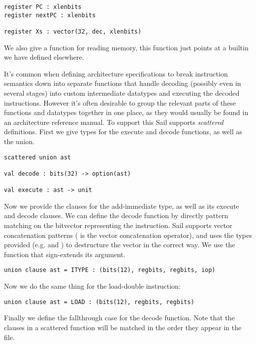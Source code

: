 \begin{lstlisting}
register PC : xlenbits
register nextPC : xlenbits

register Xs : vector(32, dec, xlenbits)
\end{lstlisting}



\sailoverloadAX

We also give a function  for reading memory, this function
just points at a builtin we have defined elsewhere.


It's common when defining architecture specifications to break
instruction semantics down into separate functions that handle
decoding (possibly even in several stages) into custom intermediate
datatypes and executing the decoded instructions. However it's often
desirable to group the relevant parts of these functions and datatypes
together in one place, as they would usually be found in an
architecture reference manual. To support this Sail supports
\emph{scattered} definitions. First we give types for the execute and
decode functions, as well as the  union.


\begin{lstlisting}
scattered union ast

val decode : bits(32) -> option(ast)

val execute : ast -> unit
\end{lstlisting}

Now we provide the clauses for the add-immediate  type, as
well as its execute and decode clauses. We can define the decode
function by directly pattern matching on the bitvector representing
the instruction. Sail supports vector concatenation patterns (
is the vector concatenation operator), and uses the types provided
(e.g.  and ) to destructure the vector in the
correct way. We use the  function that sign-extends
its argument.

\begin{lstlisting}
union clause ast = ITYPE : (bits(12), regbits, regbits, iop)
\end{lstlisting}

\sailfclITYPEdecode
\sailfclITYPEexecute

\noindent Now we do the same thing for the load-double instruction:

\begin{lstlisting}
union clause ast = LOAD : (bits(12), regbits, regbits)
\end{lstlisting}

\sailfclLOADdecode
\sailfclLOADexecute

\noindent Finally we define the fallthrough case for the decode function. Note
that the clauses in a scattered function will be matched in the order
they appear in the file.
